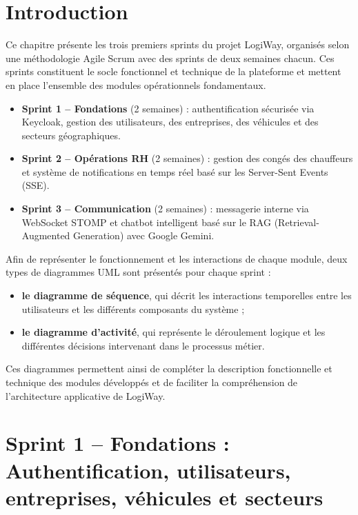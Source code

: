 \documentclass[12pt,a4paper]{report}
\begin{document}
\section{Introduction}
\label{sec:ch3-introduction}

Ce chapitre présente les trois premiers sprints du projet LogiWay, organisés
selon une méthodologie Agile Scrum avec des sprints de deux semaines chacun.
Ces sprints constituent le socle fonctionnel et technique de la plateforme
et mettent en place l'ensemble des modules opérationnels fondamentaux.

\begin{itemize}
    \item \textbf{Sprint 1 -- Fondations} (2 semaines) : authentification
    sécurisée via Keycloak, gestion des utilisateurs, des entreprises, des
    véhicules et des secteurs géographiques.
    \item \textbf{Sprint 2 -- Opérations RH} (2 semaines) : gestion des
    congés des chauffeurs et système de notifications en temps réel basé
    sur les Server-Sent Events (SSE).
    \item \textbf{Sprint 3 -- Communication} (2 semaines) : messagerie
    interne via WebSocket STOMP et chatbot intelligent basé sur le
    RAG (Retrieval-Augmented Generation) avec Google Gemini.
\end{itemize}

Afin de représenter le fonctionnement et les interactions de chaque module,
deux types de diagrammes UML sont présentés pour chaque sprint :
\begin{itemize}
    \item \textbf{le diagramme de séquence}, qui décrit les interactions
    temporelles entre les utilisateurs et les différents composants du système ;
    \item \textbf{le diagramme d'activité}, qui représente le déroulement
    logique et les différentes décisions intervenant dans le processus métier.
\end{itemize}

Ces diagrammes permettent ainsi de compléter la description fonctionnelle
et technique des modules développés et de faciliter la compréhension de
l'architecture applicative de LogiWay.


\section{Sprint 1 -- Fondations : Authentification, utilisateurs, entreprises, véhicules et secteurs}
\label{sec:ch3-sprint1}
\end{document}
